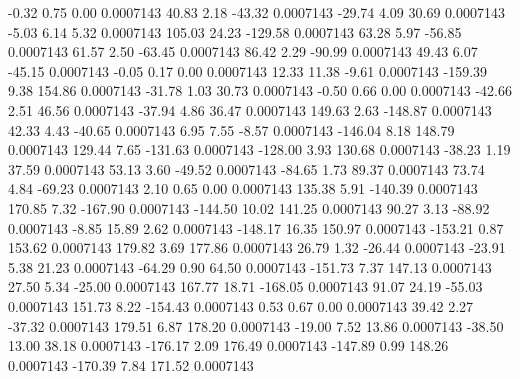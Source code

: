        -0.32        0.75        0.00     0.0007143
       40.83        2.18      -43.32     0.0007143
      -29.74        4.09       30.69     0.0007143
       -5.03        6.14        5.32     0.0007143
      105.03       24.23     -129.58     0.0007143
       63.28        5.97      -56.85     0.0007143
       61.57        2.50      -63.45     0.0007143
       86.42        2.29      -90.99     0.0007143
       49.43        6.07      -45.15     0.0007143
       -0.05        0.17        0.00     0.0007143
       12.33       11.38       -9.61     0.0007143
     -159.39        9.38      154.86     0.0007143
      -31.78        1.03       30.73     0.0007143
       -0.50        0.66        0.00     0.0007143
      -42.66        2.51       46.56     0.0007143
      -37.94        4.86       36.47     0.0007143
      149.63        2.63     -148.87     0.0007143
       42.33        4.43      -40.65     0.0007143
        6.95        7.55       -8.57     0.0007143
     -146.04        8.18      148.79     0.0007143
      129.44        7.65     -131.63     0.0007143
     -128.00        3.93      130.68     0.0007143
      -38.23        1.19       37.59     0.0007143
       53.13        3.60      -49.52     0.0007143
      -84.65        1.73       89.37     0.0007143
       73.74        4.84      -69.23     0.0007143
        2.10        0.65        0.00     0.0007143
      135.38        5.91     -140.39     0.0007143
      170.85        7.32     -167.90     0.0007143
     -144.50       10.02      141.25     0.0007143
       90.27        3.13      -88.92     0.0007143
       -8.85       15.89        2.62     0.0007143
     -148.17       16.35      150.97     0.0007143
     -153.21        0.87      153.62     0.0007143
      179.82        3.69      177.86     0.0007143
       26.79        1.32      -26.44     0.0007143
      -23.91        5.38       21.23     0.0007143
      -64.29        0.90       64.50     0.0007143
     -151.73        7.37      147.13     0.0007143
       27.50        5.34      -25.00     0.0007143
      167.77       18.71     -168.05     0.0007143
       91.07       24.19      -55.03     0.0007143
      151.73        8.22     -154.43     0.0007143
        0.53        0.67        0.00     0.0007143
       39.42        2.27      -37.32     0.0007143
      179.51        6.87      178.20     0.0007143
      -19.00        7.52       13.86     0.0007143
      -38.50       13.00       38.18     0.0007143
     -176.17        2.09      176.49     0.0007143
     -147.89        0.99      148.26     0.0007143
     -170.39        7.84      171.52     0.0007143
